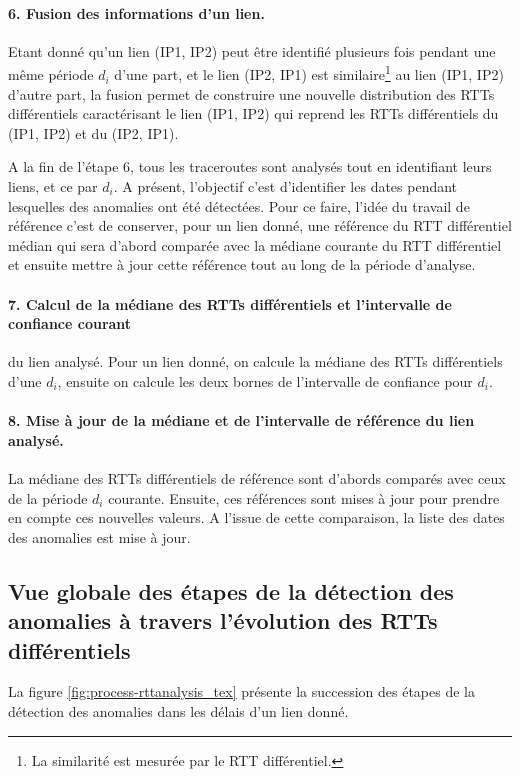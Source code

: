 \paragraph{6. Fusion des informations d'un lien. } Etant donné qu'un lien (IP1, IP2) peut être identifié plusieurs fois pendant une même période $d_i$ d'une part, et le lien (IP2, IP1) est similaire\footnote{La similarité est mesurée par le RTT différentiel.} au lien  (IP1, IP2) d'autre part, la fusion permet de construire une nouvelle distribution des RTTs différentiels caractérisant le lien (IP1, IP2) qui reprend les RTTs différentiels du (IP1, IP2) et du (IP2, IP1).


A la fin de l'étape 6, tous les traceroutes sont analysés tout en identifiant leurs liens, et ce par $d_i$. A présent, l'objectif c'est d'identifier les dates pendant lesquelles des anomalies ont été détectées. Pour ce faire, l'idée du travail de référence c'est de conserver, pour un lien donné, une référence du RTT différentiel médian qui sera d'abord comparée avec la médiane courante du RTT différentiel et ensuite mettre à jour cette référence tout au long de la période d'analyse.

  
  \paragraph{7. Calcul de la médiane des RTTs différentiels et   l'intervalle de confiance courant} du lien analysé. Pour un lien donné, on calcule la médiane des RTTs différentiels d'une $d_i$, ensuite on calcule les deux bornes de l'intervalle de confiance pour $d_i$.
  
  \paragraph{8. Mise à jour de la médiane et de l'intervalle de  référence du lien analysé.} La médiane des RTTs différentiels de référence sont d'abords comparés avec ceux de la période $d_i$ courante. Ensuite, ces références sont mises à jour pour prendre en compte ces nouvelles valeurs. A l'issue de cette comparaison, la liste des dates des anomalies est mise à jour.
  


\subsection{Vue globale des étapes de la détection des anomalies à travers l'évolution des RTTs différentiels}
La figure 	\ref{fig:process-rttanalysis_tex} présente la succession des étapes de la détection des anomalies dans les délais d'un lien donné. 

